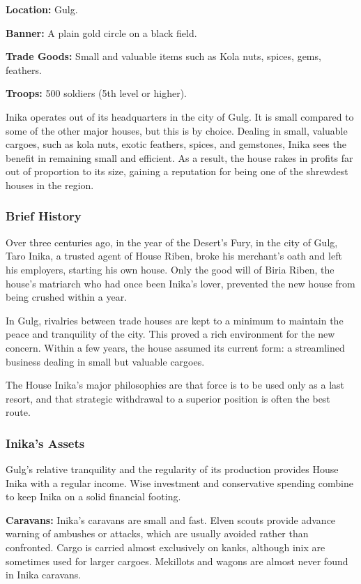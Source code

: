 \textbf{Location:} Gulg.

\textbf{Banner:} A plain gold circle on a black field.

\textbf{Trade Goods:} Small and valuable items such as Kola nuts, spices, gems, feathers.

\textbf{Troops:} 500 soldiers (5th level or higher).

Inika operates out of its headquarters in the city of Gulg. It is small compared to some of the other major houses, but this is by choice. Dealing in small, valuable cargoes, such as kola nuts, exotic feathers, spices, and gemstones, Inika sees the benefit in remaining small and efficient. As a result, the house rakes in profits far out of proportion to its size, gaining a reputation for being one of the shrewdest houses in the region.

\subsubsection{Brief History}
Over three centuries ago, in the year of the Desert's Fury, in the city of Gulg, Taro Inika, a trusted agent of House Riben, broke his merchant's oath and left his employers, starting his own house. Only the good will of Biria Riben, the house's matriarch who had once been Inika's lover, prevented the new house from being crushed within a year.

In Gulg, rivalries between trade houses are kept to a minimum to maintain the peace and tranquility of the city. This proved a rich environment for the new concern. Within a few years, the house assumed its current form: a streamlined business dealing in small but valuable cargoes.

The House Inika's major philosophies are that force is to be used only as a last resort, and that strategic withdrawal to a superior position is often the best route.

\subsubsection{Inika's Assets}
Gulg's relative tranquility and the regularity of its production provides House Inika with a regular income. Wise investment and conservative spending combine to keep Inika on a solid financial footing.

\textbf{Caravans:} Inika's caravans are small and fast. Elven scouts provide advance warning of ambushes or attacks, which are usually avoided rather than confronted. Cargo is carried almost exclusively on kanks, although inix are sometimes used for larger cargoes. Mekillots and wagons are almost never found in Inika caravans.

